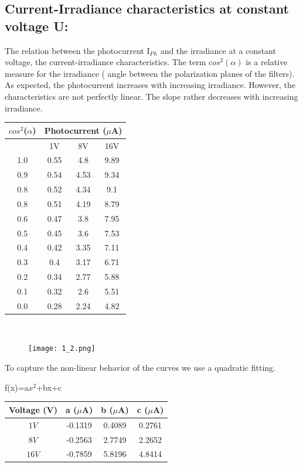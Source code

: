\documentclass[12pt]{report}
\begin{document}
\subsection{Current-Irradiance characteristics at constant voltage U:}
The relation between the photocurrent I$_P$$_h$ and the irradiance at a constant voltage, the current-irradiance characteristics. The term $cos^2(\alpha)$ is a relative measure for the
irradiance ( angle between the polarization planes of the filters). As expected, the photocurrent increases with increasing irradiance. However, the characteristics are not perfectly linear. The slope rather decreases with increasing irradiance. 

\begin{center}
	\begin{tabular}{ |c|c|c|c| } 
		\hline
		$cos^2$($\alpha$) & \multicolumn{3}{|c|}{Photocurrent ($\mu$A)}\\ 
		\hline
		& 1V & 8V & 16V \\
		\hline
		1.0 & 0.55 & 4.8  & 9.89 \\
		0.9 & 0.54 & 4.53 & 9.34 \\
		0.8 & 0.52 & 4.34 & 9.1  \\
		0.8 & 0.51 & 4.19 & 8.79 \\
		0.6 & 0.47 & 3.8  & 7.95 \\
		0.5 & 0.45 & 3.6  & 7.53 \\
		0.4 & 0.42 & 3.35 & 7.11 \\
		0.3 & 0.4  & 3.17 & 6.71 \\
		0.2 & 0.34 & 2.77 & 5.88 \\
		0.1 & 0.32 & 2.6  & 5.51 \\
		0.0 & 0.28 & 2.24 & 4.82 \\
		\hline
	\end{tabular}
	\\
\end{center}

\begin{figure}[h!]
	\centering
	\texttt{[image: 1\_2.png]}
\end{figure}

To capture the non-linear behavior of the curves we use a quadratic fitting.\\
\begin{center}
	f(x)=a$x^2$+bx+c
\end{center}

\begin{center}
	\begin{tabular}{ |c|c|c|c| } 
		\hline
		Voltage (V) &  a ($\mu$A) & b ($\mu$A) & c ($\mu$A)\\ 
		\hline
		$1V$  & -0.1319 & 0.4089 & 0.2761\\
		$8V$  & -0.2563 & 2.7749 & 2.2652\\
		$16V$ & -0.7859 & 5.8196 & 4.8414\\
		\hline
	\end{tabular}
	\\
\end{center}
\end{document}
